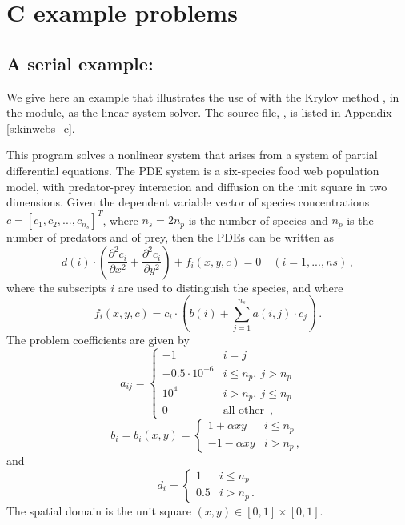 \section{C example problems}\label{s:ex_c}

\subsection{A serial example: }\label{ss:kinwebs}

We give here an example that illustrates the use of {\kinsol} with the Krylov
method {\spgmr}, in the {\kinspgmr} module, as the linear system solver.
The source file, , is listed in Appendix \ref{s:kinwebs_c}.

This program solves a nonlinear system that arises from a system of partial
differential equations. The PDE system is a six-species food web population
model, with predator-prey interaction and diffusion on the unit square in
two dimensions. Given the dependent variable vector of species concentrations
$c = [c_1, c_2,..., c_{n_s}]^T$, where $n_s = 2 n_p$ is the number of species 
and $n_p$ is the number of predators and of prey, then
the PDEs can be written as
\begin{equation}\label{e:kinwebs_pde}
  d(i) \cdot \left( \frac{\partial^2 c_i}{\partial x^2} + 
    \frac{\partial^2 c_i}{\partial y^2} \right) + f_i(x,y,c) = 0
  \quad (i=1,...,ns) \, ,
\end{equation}
where the subscripts $i$ are used to distinguish the species, and where
\begin{equation}\label{e:kinwebs_fterm}
f_i(x,y,c) = c_i \cdot \left(b(i) + \sum_{j=1}^{n_s} a(i,j) \cdot c_j \right) \, .
\end{equation}
The problem coefficients are given by
\begin{equation*}
  a_{ij} = 
  \begin{cases}
    -1                 & i=j \\
    -0.5 \cdot 10^{-6} & i \leq n_p , ~ j > n_p  \\
    10^4               & i > n_p , ~ j \leq n_p  \\
    0                  & \mbox{all other } \, ,
  \end{cases}
\end{equation*}
\begin{equation*}
  b_i = b_i(x,y) = 
  \begin{cases}
    1 + \alpha xy   & i \leq n_p  \\
    -1 - \alpha xy   & i > n_p \, ,
  \end{cases}
\end{equation*}
and
\begin{equation*}
  d_i = 
  \begin{cases}
    1 & i \leq n_p  \\
    0.5 & i > n_p  \, .
  \end{cases}
\end{equation*}
The spatial domain is the unit square $(x,y) \in [0,1] \times [0,1]$.

